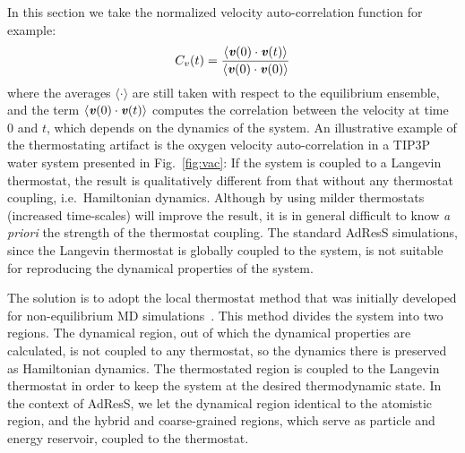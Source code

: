\documentclass[epjST]{svjour}
\newcommand{\vect}[1]{\textbf{\textit{#1}}}
\begin{document}
In this section we take the normalized velocity auto-correlation function
for example:
\begin{align}
  C_v(t) = \frac{\langle \vect v(0)\cdot \vect v(t) \rangle}{\langle \vect v(0)\cdot \vect v(0) \rangle}
\end{align}
where the averages $\langle\cdot\rangle$ are still taken with respect
to the equilibrium ensemble, and the term
$\langle \vect v(0)\cdot \vect v(t)\rangle$ computes the correlation
between the velocity at time $0$ and $t$, which depends on the dynamics of the system. 
An illustrative example of the thermostating artifact is 
the oxygen velocity auto-correlation
in a TIP3P~\cite{jorgensen1983comparison} water system presented in Fig.~\ref{fig:vac}: If the system
is coupled to a Langevin thermostat, the result is qualitatively
different from that without any thermostat coupling, i.e.~Hamiltonian
dynamics. Although by using milder thermostats (increased time-scales)
will improve the result, it is in general difficult to know \emph{a priori}
the strength of the thermostat coupling.
The standard AdResS simulations, since the Langevin thermostat
is globally coupled to the system,  is not suitable for reproducing the dynamical
properties of the system.

The solution is to adopt the local thermostat method that was initially
developed for non-equilibrium MD simulations~\cite{wang2014exploring}.
This method divides the system into two regions.
The dynamical region, out of which the dynamical properties are calculated, is not coupled
to any thermostat, so the dynamics there is preserved as Hamiltonian dynamics.
The thermostated region is coupled to the Langevin thermostat in order to keep the system
at the desired thermodynamic state.
In the context of AdResS, we let the dynamical region identical to the atomistic region,
and
the hybrid and coarse-grained regions, which serve as particle and energy reservoir, coupled to the thermostat.
\end{document}
